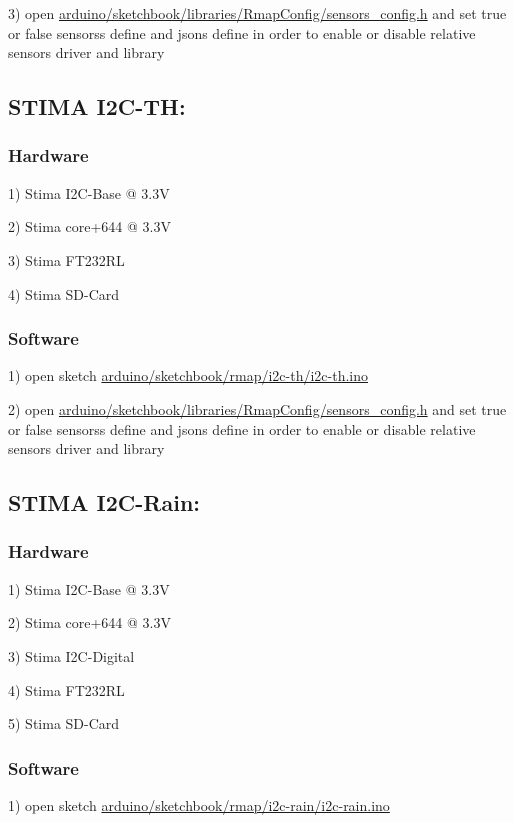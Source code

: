 3) open \hyperlink{sensors__config_8h}{arduino/sketchbook/libraries/\+Rmap\+Config/sensors\+\_\+config.\+h} and set true or false sensors\textquotesingle{}s define and json\textquotesingle{}s define in order to enable or disable relative sensor\textquotesingle{}s driver and library\hypertarget{index_i2c-th}{}\subsection{S\+T\+I\+M\+A I2\+C-\/\+T\+H\+:}\label{index_i2c-th}
\hypertarget{index_stima_i2c_th_hardware}{}\subsubsection{Hardware}\label{index_stima_i2c_th_hardware}
1) Stima I2\+C-\/\+Base @ 3.\+3V

2) Stima core+644 @ 3.\+3V

3) Stima F\+T232\+RL

4) Stima S\+D-\/\+Card\hypertarget{index_stima_i2c_th_software}{}\subsubsection{Software}\label{index_stima_i2c_th_software}
1) open sketch \hyperlink{i2c-th_8ino}{arduino/sketchbook/rmap/i2c-\/th/i2c-\/th.\+ino}

2) open \hyperlink{sensors__config_8h}{arduino/sketchbook/libraries/\+Rmap\+Config/sensors\+\_\+config.\+h} and set true or false sensors\textquotesingle{}s define and json\textquotesingle{}s define in order to enable or disable relative sensor\textquotesingle{}s driver and library\hypertarget{index_i2c-rain}{}\subsection{S\+T\+I\+M\+A I2\+C-\/\+Rain\+:}\label{index_i2c-rain}
\hypertarget{index_stima_i2c_rain_hardware}{}\subsubsection{Hardware}\label{index_stima_i2c_rain_hardware}
1) Stima I2\+C-\/\+Base @ 3.\+3V

2) Stima core+644 @ 3.\+3V

3) Stima I2\+C-\/\+Digital

4) Stima F\+T232\+RL

5) Stima S\+D-\/\+Card\hypertarget{index_stima_i2c_rain_software}{}\subsubsection{Software}\label{index_stima_i2c_rain_software}
1) open sketch \hyperlink{i2c-rain_8ino}{arduino/sketchbook/rmap/i2c-\/rain/i2c-\/rain.\+ino}

